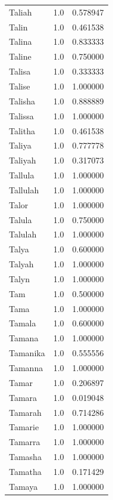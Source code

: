 \documentclass[
  letterpaper,
  DIV=11,
  numbers=noendperiod]{scrreprt}
\begin{document}
\begin{tabular}{lrr}
Taliah          &   1.0 &   0.578947 \\
Talin           &   1.0 &   0.461538 \\
Talina          &   1.0 &   0.833333 \\
Taline          &   1.0 &   0.750000 \\
Talisa          &   1.0 &   0.333333 \\
Talise          &   1.0 &   1.000000 \\
Talisha         &   1.0 &   0.888889 \\
Talissa         &   1.0 &   1.000000 \\
Talitha         &   1.0 &   0.461538 \\
Taliya          &   1.0 &   0.777778 \\
Taliyah         &   1.0 &   0.317073 \\
Tallula         &   1.0 &   1.000000 \\
Tallulah        &   1.0 &   1.000000 \\
Talor           &   1.0 &   1.000000 \\
Talula          &   1.0 &   0.750000 \\
Talulah         &   1.0 &   1.000000 \\
Talya           &   1.0 &   0.600000 \\
Talyah          &   1.0 &   1.000000 \\
Talyn           &   1.0 &   1.000000 \\
Tam             &   1.0 &   0.500000 \\
Tama            &   1.0 &   1.000000 \\
Tamala          &   1.0 &   0.600000 \\
Tamana          &   1.0 &   1.000000 \\
Tamanika        &   1.0 &   0.555556 \\
Tamanna         &   1.0 &   1.000000 \\
Tamar           &   1.0 &   0.206897 \\
Tamara          &   1.0 &   0.019048 \\
Tamarah         &   1.0 &   0.714286 \\
Tamarie         &   1.0 &   1.000000 \\
Tamarra         &   1.0 &   1.000000 \\
Tamasha         &   1.0 &   1.000000 \\
Tamatha         &   1.0 &   0.171429 \\
Tamaya          &   1.0 &   1.000000 \\

\end{tabular}
\end{document}
